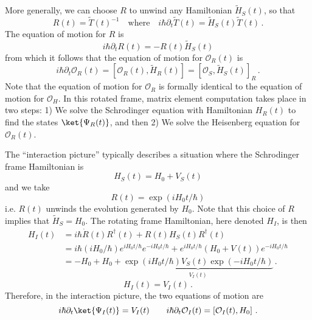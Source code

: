More generally, we can choose $R$ to unwind any Hamiltonian $\tilde{H}_S(t)$, so that
\begin{equation}
  R(t) = \tilde{T}(t)^{-1}
  \quad \text{where} \quad
  i \hbar \partial_t \tilde{T}(t) = \tilde{H}_S(t) \tilde{T}(t)
  \, .
\end{equation}
The equation of motion for $R$ is
\begin{equation}
  i \hbar \partial_t R(t) = - R(t) \tilde{H}_S(t)
\end{equation}
from which it follows that the equation of motion for $\mathcal{O}_R(t)$ is
\begin{equation}
  i \hbar \partial_t \mathcal{O}_R(t)
  = \left[ \mathcal{O}_R(t), \tilde{H}_R(t) \right]
  = \left[ \mathcal{O}_S, \tilde{H}_S(t) \right]_R
  \, .
\end{equation}
Note that the equation of motion for $\mathcal{O}_R$ is formally identical to the equation of motion for $\mathcal{O}_H$.
In this rotated frame, matrix element computation takes place in two steps: 1) We solve the Schrodinger equation with Hamiltonian $H_R(t)$ to find the states $\ket{\Psi_R(t)}$, and then 2) We solve the Heisenberg equation for $\mathcal{O}_R(t)$.


The ``interaction picture'' typically describes a situation where the Schrodinger frame Hamiltonian is
\begin{equation}
  H_S(t) = H_0 + V_S(t)
\end{equation}
and we take
\begin{equation}
  R(t) = \exp(i H_0 t / \hbar)
\end{equation}
i.e. $R(t)$ unwinds the evolution generated by $H_0$.
Note that this choice of $R$ implies that $\tilde{H}_S = H_0$.
The rotating frame Hamiltonian, here denoted $H_I$, is then
\begin{align*}
  H_I(t)
  &= i \hbar \dot{R}(t) R^\dagger(t) + R(t) H_S(t) R^\dagger(t) \\
  &= i \hbar (i H_0 / \hbar) e^{i H_0 t / \hbar} e^{-i H_0 t / \hbar}
    + e^{i H_0 t / \hbar} \left( H_0 + V(t) \right) e^{-i H_0 t/ \hbar} \\
  &= - H_0 + H_0 +
    \underbrace{\exp \left(i H_0 t / \hbar \right) V_S(t) \exp \left(-i H_0 t / \hbar \right)}_{V_I(t)}
  \, .
\end{align*}
\begin{equation}
  H_I(t) = V_I(t) \, .
\end{equation}
Therefore, in the interaction picture, the two equations of motion are
\begin{equation}
  i \hbar \partial_t \ket{\Psi_I(t)} = V_I(t)
  \qquad
  i \hbar \partial_t \mathcal{O}_I(t) = \left[ \mathcal{O}_I(t), H_0 \right]
  \, .
\end{equation}


